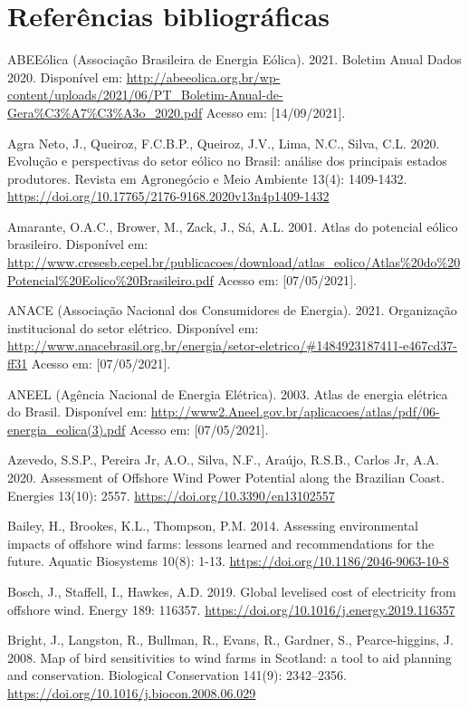 \documentclass[
  oneside]{scrbook}
\begin{document}
\newpage

\hypertarget{referuxeancias-bibliogruxe1ficas}{%
\section{Referências bibliográficas}\label{referuxeancias-bibliogruxe1ficas}}

ABEEólica (Associação Brasileira de Energia Eólica). 2021. Boletim Anual Dados 2020. Disponível em: \url{http://abeeolica.org.br/wp-content/uploads/2021/06/PT_Boletim-Anual-de-Gera\%C3\%A7\%C3\%A3o_2020.pdf} Acesso em: {[}14/09/2021{]}.

Agra Neto, J., Queiroz, F.C.B.P., Queiroz, J.V., Lima, N.C., Silva, C.L. 2020. Evolução e perspectivas do setor eólico no Brasil: análise dos principais estados produtores. Revista em Agronegócio e Meio Ambiente 13(4): 1409-1432. \url{https://doi.org/10.17765/2176-9168.2020v13n4p1409-1432}

Amarante, O.A.C., Brower, M., Zack, J., Sá, A.L. 2001. Atlas do potencial eólico brasileiro. Disponível em: \url{http://www.cresesb.cepel.br/publicacoes/download/atlas_eolico/Atlas\%20do\%20Potencial\%20Eolico\%20Brasileiro.pdf} Acesso em: {[}07/05/2021{]}.

ANACE (Associação Nacional dos Consumidores de Energia). 2021. Organização institucional do setor elétrico. Disponível em: \url{http://www.anacebrasil.org.br/energia/setor-eletrico/\#1484923187411-e467cd37-ff31} Acesso em: {[}07/05/2021{]}.

ANEEL (Agência Nacional de Energia Elétrica). 2003. Atlas de energia elétrica do Brasil. Disponível em: \url{http://www2.Aneel.gov.br/aplicacoes/atlas/pdf/06-energia_eolica(3).pdf} Acesso em: {[}07/05/2021{]}.

Azevedo, S.S.P., Pereira Jr, A.O., Silva, N.F., Araújo, R.S.B., Carlos Jr, A.A. 2020. Assessment of Offshore Wind Power Potential along the Brazilian Coast. Energies 13(10): 2557. \url{https://doi.org/10.3390/en13102557}

Bailey, H., Brookes, K.L., Thompson, P.M. 2014. Assessing environmental impacts of offshore wind farms: lessons learned and recommendations for the future. Aquatic Biosystems 10(8): 1-13. \url{https://doi.org/10.1186/2046-9063-10-8}

Bosch, J., Staffell, I., Hawkes, A.D. 2019. Global levelised cost of electricity from offshore wind. Energy 189: 116357. \url{https://doi.org/10.1016/j.energy.2019.116357}

Bright, J., Langston, R., Bullman, R., Evans, R., Gardner, S., Pearce-higgins, J. 2008. Map of bird sensitivities to wind farms in Scotland: a tool to aid planning and conservation. Biological Conservation 141(9): 2342--2356. \url{https://doi.org/10.1016/j.biocon.2008.06.029}
\end{document}

